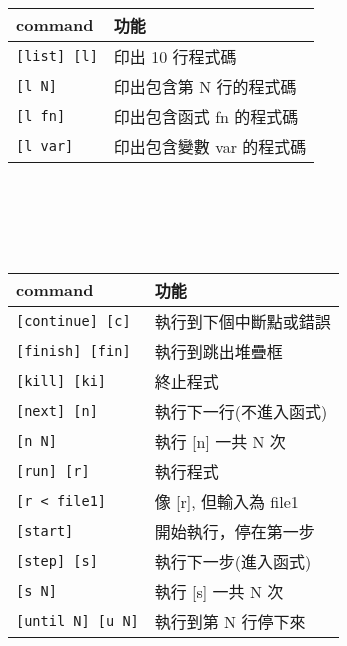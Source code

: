 \begin{center}
     \\
    \begin{tabular}{|p{2.28cm}|p{2.68cm}|}
        \hline
        command                         & 功能 \\
        \hline
        \verb|[list] [l]|               & 印出 10 行程式碼  \\
        \verb|[l N]|                    & 印出包含第 N 行的程式碼  \\
        \verb|[l fn]|                   & 印出包含函式 fn 的程式碼 \\
        \verb|[l var]|                  & 印出包含變數 var 的程式碼 \\
        \hline
    \end{tabular} \\
    \hspace{\fill} \\
    \hspace{\fill} \\

     \\
    \begin{tabular}{|p{2.28cm}|p{2.68cm}|}
        \hline
        command                         & 功能 \\
        \hline
        \verb|[continue] [c]|           & 執行到下個中斷點或錯誤 \\
        \verb|[finish] [fin]|           & 執行到跳出堆疊框 \\
        \verb|[kill] [ki]|              & 終止程式 \\
        \verb|[next] [n]|               & 執行下一行(不進入函式) \\
        \verb|[n N]|                    & 執行 [n] 一共 N 次 \\
        \verb|[run] [r]|                & 執行程式 \\
        \verb|[r < file1]|              & 像 [r], 但輸入為 file1 \\
        \verb|[start]|                  & 開始執行，停在第一步 \\
        \verb|[step] [s]|               & 執行下一步(進入函式) \\
        \verb|[s N]|                    & 執行 [s] 一共 N 次 \\
        \verb|[until N] [u N]|          & 執行到第 N 行停下來 \\
        \hline
    \end{tabular} \\
    \hspace{\fill} \\
    \hspace{\fill} \\


\end{center}
